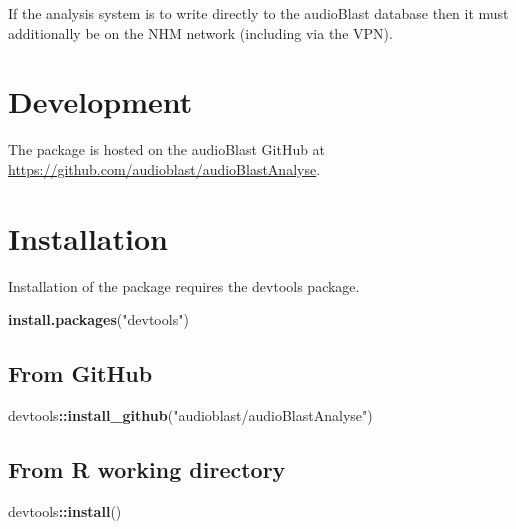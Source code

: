 \documentclass[
]{book}
\newenvironment{Shaded}{\begin{snugshade}}{\end{snugshade}}
\newcommand{\FunctionTok}[1]{\textcolor[rgb]{0.13,0.29,0.53}{\textbf{#1}}}
\newcommand{\NormalTok}[1]{#1}
\newcommand{\SpecialCharTok}[1]{\textcolor[rgb]{0.81,0.36,0.00}{\textbf{#1}}}
\newcommand{\StringTok}[1]{\textcolor[rgb]{0.31,0.60,0.02}{#1}}
\begin{document}
If the analysis system is to write directly to the audioBlast database then it must additionally be on the NHM network (including via the VPN).

\hypertarget{development}{%
\section{Development}\label{development}}

The package is hosted on the audioBlast GitHub at \url{https://github.com/audioblast/audioBlastAnalyse}.

\hypertarget{installation}{%
\section{Installation}\label{installation}}

Installation of the package requires the devtools package.

\begin{Shaded}
\begin{Highlighting}[]
\FunctionTok{install.packages}\NormalTok{(}\StringTok{"devtools"}\NormalTok{)}
\end{Highlighting}
\end{Shaded}

\hypertarget{from-github}{%
\subsection{From GitHub}\label{from-github}}

\begin{Shaded}
\begin{Highlighting}[]
\NormalTok{devtools}\SpecialCharTok{::}\FunctionTok{install\_github}\NormalTok{(}\StringTok{"audioblast/audioBlastAnalyse"}\NormalTok{)}
\end{Highlighting}
\end{Shaded}

\hypertarget{from-r-working-directory}{%
\subsection{From R working directory}\label{from-r-working-directory}}

\begin{Shaded}
\begin{Highlighting}[]
\NormalTok{devtools}\SpecialCharTok{::}\FunctionTok{install}\NormalTok{()}
\end{Highlighting}
\end{Shaded}
\end{document}
